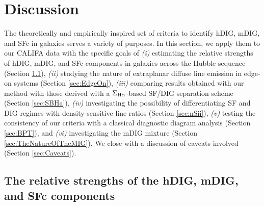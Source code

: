 \documentclass[a4paper, fleqn, usenatbib, useAMS]{mnras}
\newcommand{\Ha}{\ifmmode {\rm H}\alpha \else H$\alpha$\fi\xspace}
\begin{document}
\section{Discussion}
\label{sec:Discussion}

The theoretically and empirically inspired set of criteria to identify hDIG, mDIG, and SFc in galaxies serves a variety of purposes. In this section, we apply them to our CALIFA data with the specific goals of \textit{(i)} estimating the relative strengths of hDIG, mDIG, and SFc components in galaxies across the Hubble sequence (Section \ref{sec:CurveOfGrowth}), \textit{(ii)} studying the nature of extraplanar diffuse line emission in edge-on systems (Section \ref{sec:EdgeOn}), \textit{(iii)} comparing results obtained with our method with those derived with a $\Sigma_{\Ha}$-based SF/DIG separation scheme (Section \ref{sec:SBHa}), \textit{(iv)} investigating the possibility of differentiating SF and DIG regimes with density-sensitive line ratios (Section \ref{sec:nSii}), \textit{(v)} testing the consistency of our criteria with a classical diagnostic diagram analysis (Section \ref{sec:BPT}), and \textit{(vi)} investigating the mDIG mixture (Section \ref{sec:TheNatureOfTheMIG}). We close with a discussion of caveats involved (Section \ref{sec:Caveats}).

\subsection{The relative strengths of the hDIG, mDIG, and SFc components}
\label{sec:CurveOfGrowth}
\end{document}
